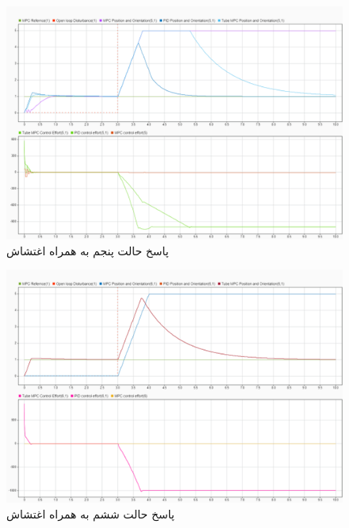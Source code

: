 \begin{figure}
	\centering
	\includegraphics[width=1\linewidth]{../img/Disturbance_ResponseS5}
	\caption{پاسخ حالت پنجم به همراه اغتشاش}
	\label{fig:disturbanceresponses5}
\end{figure}
\begin{figure}[H]
	\centering
	\includegraphics[width=1\linewidth]{../img/Disturbance_ResponseS6}
	\caption{پاسخ حالت ششم به همراه اغتشاش}
	\label{fig:disturbanceresponses6}
\end{figure}

